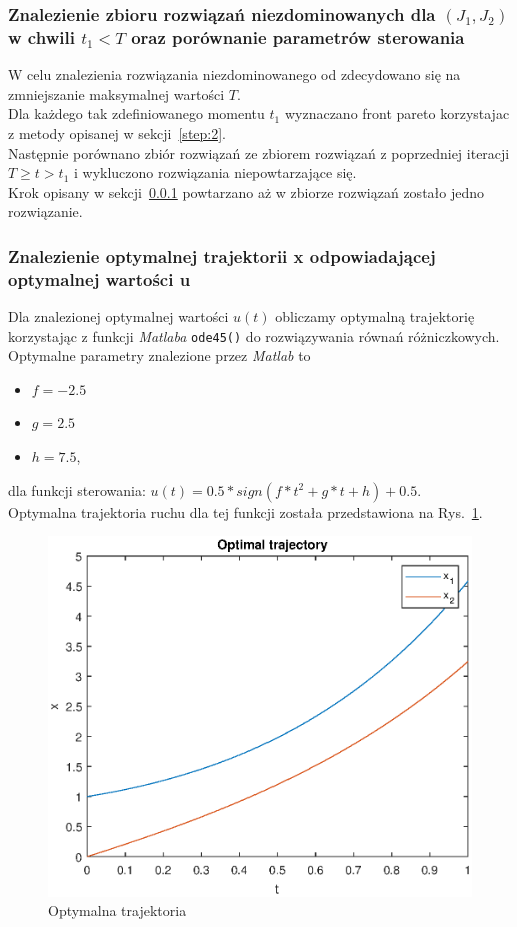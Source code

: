 \documentclass[a4paper]{article}
\begin{document}
\subsubsection{Znalezienie zbioru rozwiązań niezdominowanych dla $(J_1, J_2)$ w chwili $t_1 < T$ oraz porównanie parametrów sterowania}
\label{step:3}

W celu znalezienia rozwiązania niezdominowanego od zdecydowano się na zmniejszanie maksymalnej wartości $T$.
\\
Dla każdego tak zdefiniowanego momentu $t_1$ wyznaczano front pareto korzystajac z metody opisanej w sekcji~\ref{step:2}.
\\
Następnie porównano zbiór rozwiązań ze zbiorem rozwiązań z poprzedniej iteracji $T \geq t > t_1$ i wykluczono rozwiązania niepowtarzające się.
\\ Krok opisany w sekcji~\ref{step:3} powtarzano aż w zbiorze rozwiązań zostało jedno rozwiązanie. 

\subsubsection{Znalezienie optymalnej trajektorii x odpowiadającej optymalnej wartości u}
\label{step:4}

Dla znalezionej optymalnej wartości $u(t)$ obliczamy optymalną trajektorię korzystając z funkcji \textit{Matlaba} \texttt{ode45()} do rozwiązywania równań różniczkowych. 
\\
Optymalne parametry znalezione przez \textit{Matlab} to 
\begin{itemize}
    \item $f = -2.5 $
    \item $g = 2.5 $
    \item $h = 7.5$,
\end{itemize}
dla funkcji sterowania: $u(t) = 0.5*sign(f*t^2 + g*t + h)+0.5$.
\\Optymalna trajektoria ruchu dla tej funkcji została przedstawiona na Rys.~\ref{fig:trajectory}.
\begin{figure}[H]
    \centering
    \includegraphics{path.eps}
    \caption{Optymalna trajektoria}
    \label{fig:trajectory}
\end{figure}
\end{document}
